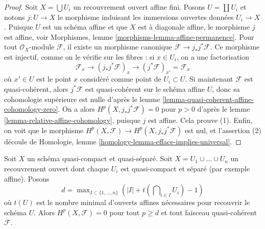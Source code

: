 \begin{proof}
Soit $X = \bigcup U_i$ un recouvrement ouvert affine fini.
Posons $U = \coprod U_i$ et notons $j : U \to X$
le morphisme induisant les immersions ouvertes données $U_i \to X$.
Puisque $U$ est un schéma affine et que $X$ est à diagonale affine,
le morphisme $j$ est affine, voir
Morphismes, lemme \ref{morphisms-lemma-affine-permanence}.
Pour tout $\mathcal{O}_X$-module $\mathcal{F}$, il
existe un morphisme canonique $\mathcal{F} \to j_*j^*\mathcal{F}$.
Ce morphisme est injectif, comme on le vérifie sur les fibres :
si $x \in U_i$, on a une factorisation
$$
\mathcal{F}_x \to (j_*j^*\mathcal{F})_x
\to (j^*\mathcal{F})_{x'} = \mathcal{F}_x
$$
où $x' \in U$ est le point $x$ considéré comme point de $U_i \subset U$.
Si maintenant $\mathcal{F}$ est quasi-cohérent, alors $j^*\mathcal{F}$
est quasi-cohérent sur le schéma affine $U$, donc sa cohomologie
supérieure est nulle d'après le
lemme \ref{lemma-quasi-coherent-affine-cohomology-zero}. On
a alors $H^p(X, j_*j^*\mathcal{F}) = 0$ pour
$p > 0$ d'après le lemme \ref{lemma-relative-affine-cohomology},
puisque $j$ est affine. Cela prouve (1).
Enfin, on voit que le morphisme
$H^p(X, \mathcal{F}) \to H^p(X, j_*j^*\mathcal{F})$
est nul, et l'assertion (2) découle de
Homologie, lemme \ref{homology-lemma-efface-implies-universal}.
\end{proof}

\begin{lemma}
\label{lemma-vanishing-nr-affines-quasi-separated}
Soit $X$ un schéma quasi-compact et quasi-séparé.
Soit $X = U_1 \cup \ldots \cup U_n$ un recouvrement ouvert
dont chaque $U_i$ est quasi-compact et séparé (par exemple affine).
Posons
$$
d = \max\nolimits_{I \subset \{1, \ldots, n\}}
\left(|I| + t(\bigcap\nolimits_{i \in I} U_i) - 1\right)
$$
où $t(U)$ est le nombre minimal d'ouverts affines nécessaires pour recouvrir
le schéma $U$. Alors $H^p(X, \mathcal{F}) = 0$ pour tout $p \geq d$ et tout
faisceau quasi-cohérent $\mathcal{F}$.
\end{lemma}

